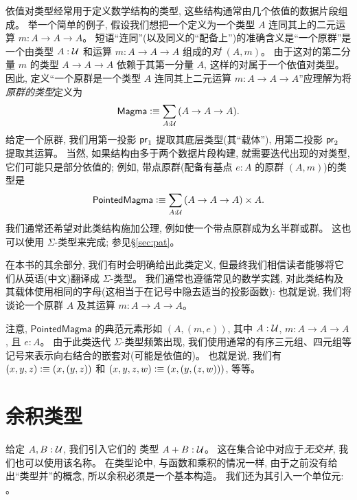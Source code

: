 依值对类型经常用于定义数学结构的类型, 这些结构通常由几个依值的数据片段组成。
举一个简单的例子, 假设我们想把一个定义为一个类型 $A$ 连同其上的二元运算 $m:A\to A\to A$。
短语``连同''(以及同义的``配备上'')的准确含义是``一个原群''是一个由类型 $A:\mathcal{U}$ 和运算 $m:A\to A\to A$ 组成的\emph{对} $(A,m)$。
由于这对的第二分量 $m$ 的类型 $A\to A\to A$ 依赖于其第一分量 $A$, 这样的对属于一个依值对类型。
因此, 定义``一个原群是一个类型 $A$ 连同其上二元运算 $m:A\to A\to A$''应理解为将\emph{原群的类型}定义为
\[ \mathsf{Magma} \defeq \sm{A:\UU} (A\to A\to A). \]
给定一个原群, 我们用第一投影 $\mathsf{pr}_{1}$ 提取其底层类型(其``载体''), 用第二投影 $\mathsf{pr}_{2}$ 提取其运算。
当然, 如果结构由多于两个数据片段构建, 就需要迭代出现的对类型, 它们可能只是部分依值的; 例如, 带点原群(配备有基点 $e:A$ 的原群 $(A,m)$)的类型是
\[ \mathsf{PointedMagma} \defeq \sm{A:\UU} (A\to A\to A) \times A. \]
我们通常还希望对此类结构施加公理, 例如使一个带点原群成为幺半群或群。
这也可以使用 $\Sigma$-类型来完成; 参见\S\ref{sec:pat}。

在本书的其余部分, 我们有时会明确给出此类定义, 但最终我们相信读者能够将它们从英语(中文)翻译成 $\Sigma$-类型。
我们通常也遵循常见的数学实践, 对此类结构及其载体使用相同的字母(这相当于在记号中隐去适当的投影函数): 也就是说, 我们将谈论一个原群 $A$ 及其运算 $m:A\to A\to A$。

注意, $\mathsf{PointedMagma}$ 的典范元素形如 $(A,(m,e))$, 其中 $A:\mathcal{U}$, $m:A\to A\to A$, 且 $e:A$。
由于此类迭代 $\Sigma$-类型频繁出现, 我们使用通常的有序三元组、四元组等记号来表示向右结合的嵌套对(可能是依值的)。
也就是说, 我们有 $(x,y,z) \vcentcolon\equiv (x,(y,z))$ 和 $(x,y,z,w)\vcentcolon\equiv (x,(y,(z,w)))$, 等等。

%

\section{余积类型}
\label{sec:coproduct-types}

给定 $A,B:\mathcal{U}$, 我们引入它们的 类型 $A+B:\mathcal{U}$。
%
%
%
%
%
%
这在集合论中对应于\emph{无交并}, 我们也可以使用该名称。
在类型论中, 与函数和乘积的情况一样, 由于之前没有给出``类型并''的概念, 所以余积必须是一个基本构造。
我们还为其引入一个单位元: 。
%
%
%

